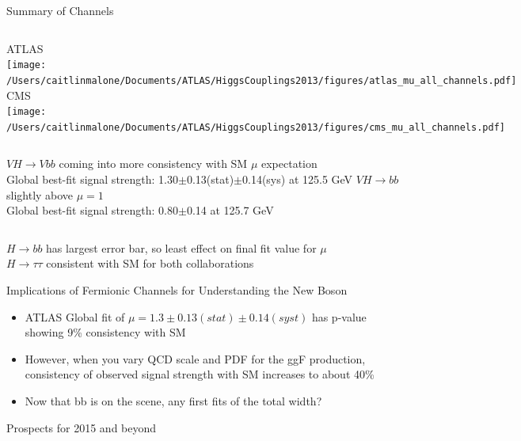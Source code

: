 \documentclass{beamer}
\begin{document}
\begin{frame}{Summary of Channels}
	\begin{columns}[c]
			ATLAS \\
			\texttt{[image: /Users/caitlinmalone/Documents/ATLAS/HiggsCouplings2013/figures/atlas\_mu\_all\_channels.pdf]}
			CMS\\
			\texttt{[image: /Users/caitlinmalone/Documents/ATLAS/HiggsCouplings2013/figures/cms\_mu\_all\_channels.pdf]}		\end{columns}
	\begin{columns}[c]

			\scriptsize
			$VH\rightarrow Vbb$ coming into more consistency with SM $\mu$ expectation  \\
			\textcolor{BrickRed}{Global best-fit signal strength: 1.30$\pm$0.13(stat)$\pm$0.14(sys) at 125.5 GeV}
			\scriptsize
			$VH\rightarrow bb$ slightly above $\mu=1$\\
			\textcolor{BrickRed}{Global best-fit signal strength: 0.80$\pm$0.14 at 125.7 GeV}
		
	\end{columns} 
	\vspace{0.5cm}
	\scriptsize
	$H\rightarrow bb$ has largest error bar, so least effect on final fit value for $\mu$\\
	$H\rightarrow \tau \tau$ consistent with SM for both collaborations
\end{frame}


\begin{frame}{Implications of Fermionic Channels for Understanding the New Boson}
	\begin{itemize} \scriptsize
		\item ATLAS Global fit of $\mu=1.3\pm0.13(stat)\pm0.14(syst)$ has p-value showing 9\% consistency with SM
		\item However, when you vary QCD scale and PDF for the ggF production, consistency of observed signal strength with SM increases to about 40\%
		\item Now that bb is on the scene, any first fits of the total width?
	\end{itemize}
\end{frame}



\begin{frame}{Prospects for 2015 and beyond}

\end{frame}
\end{document}
